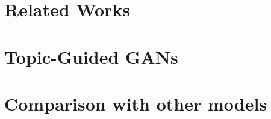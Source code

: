 \documentclass[11pt]{article}
\begin{document}
\section{Related Works}
\label{sect:RelatedWorks}

\clearpage

\section{Topic-Guided GANs}
\label{sect:TopicGuidedGANs}

\clearpage

\section{Comparison with other models}
\label{sect:Comparison}

\clearpage



\end{document}

